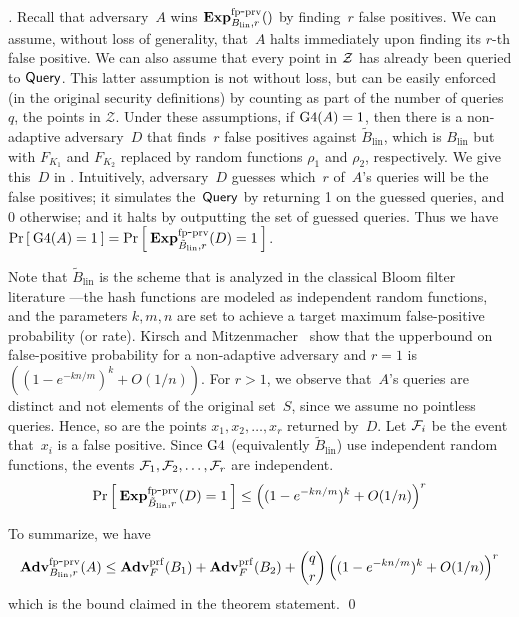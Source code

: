 \begin{proof}[]
Recall that adversary~$A$ wins $\mathrm{\mathbf{Exp}}^{\mathrm{fp\mbox{-}prv}}_{B_{\mathrm{lin}},r}()$ by finding~$r$ false positives. We can assume, without loss of generality,  that~$A$ halts immediately upon finding its $r$-th false positive.  We can also assume that every point in ${\cal Z}$ has already been queried to $\mathsf{Query}$.  This latter assumption is not without loss, but can be  easily enforced (in the original security definitions) by counting as part of the number of queries~$q$, the points in $\mathcal{Z}$. 
%
Under these assumptions, if $\text{G4}(A)=1$, then there is a non-adaptive adversary~$D$ that finds~$r$ false positives against $\tilde{B}_{\mathrm{lin}}$, which is $B_{\mathrm{lin}}$ but with $F_{K_1}$ and $F_{K_2}$ replaced by random functions $\rho_1$ and $\rho_2$, respectively.  We give this~$D$ in . Intuitively, adversary~$D$ guesses which~$r$ of~$A$'s queries will be the false positives; it simulates the~$\mathsf{Query}$ by returning 1 on the guessed queries, and 0 otherwise; and it halts by outputting the set of guessed queries.  Thus we have
$\Pr\left[\: \text{G4}(A)=1 \:\right] =\Pr\left[\: \mathrm{\mathbf{Exp}}^{\mathrm{fp\mbox{-}prv}}_{\tilde{B}_{\mathrm{lin}},r}(D) = 1 \:\right]$.

Note that $\tilde{B}_{\mathrm{lin}}$ is the scheme that is analyzed in the classical Bloom filter literature ---the hash functions are modeled as independent random functions, and the parameters $k,m,n$  are set to achieve a target maximum false-positive probability (or rate).  Kirsch and Mitzenmacher~\cite{KM} show that the upperbound on false-positive probability for a non-adaptive adversary and $r=1$ is $\left( (1-e^{-kn/m})^k + O(1/n) \right)$.  For $r>1$, we observe that~$A$'s queries are distinct and not elements of the original set~$S$, since we assume no pointless queries. Hence, so are the points $x_1,x_2,\ldots,x_r$ returned by~$D$.  Let ${\cal F}_i$ be the event that~$x_i$ is a false positive.  Since $\text{G4}$ (equivalently $\tilde{B}_{\mathrm{lin}}$) use independent random functions, the events ${\cal F}_1,{\cal F}_2,\ldots,{\cal F}_r$ are independent. 
\[
\Pr\left[\: \mathrm{\mathbf{Exp}}^{\mathrm{fp\mbox{-}prv}}_{\tilde{B}_{\mathrm{lin}},r}(D) = 1 \:\right]\leq \left( (1-e^{-kn/m})^k + O(1/n) \right)^r 
\]

To summarize, we have 
\[
\mathrm{\mathbf{Adv}}^{\mathrm{fp\mbox{-}prv}}_{B_{\mathrm{lin}},r}(A)  \leq  \mathbf{Adv}^{\mathrm{prf}}_{F}(B_1) +\mathbf{Adv}^{\mathrm{prf}}_{F}(B_2) +\dbinom{q}{r}\left( (1-e^{-kn/m})^k + O(1/n) \right)^r
\]
which is the bound claimed in the theorem statement. \hfill \qed


\end{proof}
